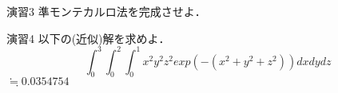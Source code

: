 \documentclass[dvipdfmx,xcolor={svgnames}]{beamer}
\begin{document}
      \begin{frame}{演習3}
        準モンテカルロ法を完成させよ．\\
      \end{frame}

      \begin{frame}{演習4}
        以下の(近似)解を求めよ．
        \begin{equation*}
          \int_0^3 \!\!\! \int_0^2 \!\!\! \int_0^1  x^2y^2z^2exp(-(x^2+y^2+z^2)) dxdydz
        \end{equation*}
        \pause
        $\fallingdotseq 0.0354754$

      \end{frame}
\end{document}
